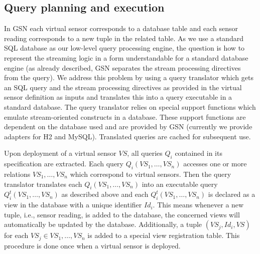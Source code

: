 \subsection{Query planning and execution}
\label{sec:query-proc-optim}

In GSN each virtual sensor corresponds to a database table and each sensor
reading corresponds to a new tuple in the related table. As we use a standard
SQL database as our low-level query processing engine, the question is how to
represent the streaming logic in a form understandable for a standard database
engine (as already described, GSN separates the stream processing directives
from the query). We address this problem by using a query translator which gets
an SQL query and the stream processing directives as provided in the virtual
sensor definition as inputs and translates this into a query executable in a
standard database. The query translator relies on special support functions
which emulate stream-oriented constructs in a database. These support functions
are dependent on the database used and are provided by GSN (currently we
provide adapters for H2 and MySQL). Translated queries are cached for subsequent use.

Upon deployment of a virtual sensor $VS$, all queries $Q_i$ contained in its
specification are extracted. Each query $Q_i(VS_1,\dots,VS_n)$ accesses one or
more relations $VS_1,\dots,VS_n$ which correspond to virtual sensors. Then the
query translator translates each $Q_i(VS_1,\dots,VS_n)$ into an executable
query $Q^t_i(VS_1,\dots,VS_n)$ as described above and each
$Q^t_i(VS_1,\dots,VS_n)$ is declared as a view in the database with a unique
identifier $Id_i$. This means whenever a new tuple, i.e., sensor reading, is
added to the database, the concerned views will automatically be updated by the
database. Additionally, a tuple $(VS_j, Id_i, VS)$ for each $VS_j \in
{VS_1,\dots,VS_n}$ is added to a special view registration table. This
procedure is done once when a virtual sensor is deployed.

